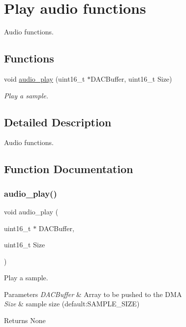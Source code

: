 \hypertarget{group___audio___play}{}\section{Play audio functions}
\label{group___audio___play}


Audio functions.  


\subsection*{Functions}
\begin{DoxyCompactItemize}
\item 
void \hyperlink{group___audio___play_gaf73a37418a80bbb39f75abe8b60b0afb}{audio\+\_\+play} (uint16\+\_\+t $\ast$D\+A\+C\+Buffer, uint16\+\_\+t Size)
\begin{DoxyCompactList}\small\item\em Play a sample. \end{DoxyCompactList}\end{DoxyCompactItemize}


\subsection{Detailed Description}
Audio functions. 



\subsection{Function Documentation}
\mbox{\label{group___audio___play_gaf73a37418a80bbb39f75abe8b60b0afb}} 
\subsubsection{\texorpdfstring{audio\+\_\+play()}{audio\_play()}}
{\footnotesize\ttfamily void audio\+\_\+play (\begin{DoxyParamCaption}\item[{uint16\+\_\+t $\ast$}]{D\+A\+C\+Buffer,  }\item[{uint16\+\_\+t}]{Size }\end{DoxyParamCaption})}



Play a sample. 


\begin{DoxyParams}{Parameters}
{\em D\+A\+C\+Buffer} & Array to be pushed to the D\+MA \\
\hline
{\em Size} & sample size (default\+:S\+A\+M\+P\+L\+E\+\_\+\+S\+I\+ZE) \\
\hline
\end{DoxyParams}
\begin{DoxyReturn}{Returns}
None 
\end{DoxyReturn}
